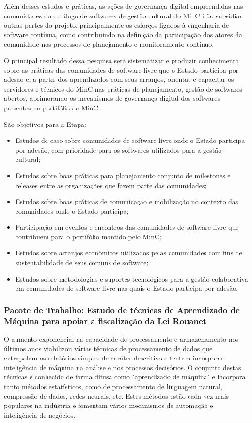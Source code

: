 Além desses estudos e práticas, as ações de governança digital empreendidas nas 
comunidades do catálogo de softwares de gestão cultural do MinC irão subsidiar 
outras partes do projeto, principalmente os esforços ligados à engenharia de software 
contínua, como contribuindo na definição da participação dos atores da comunidade nos
processos de planejamento e monitoramento contínuo.

O principal resultado dessa pesquisa será sistematizar e produzir conhecimento 
sobre as práticas das comunidades de software livre que o Estado participa por 
adesão e, a partir dos aprendizados com seus arranjos, orientar e capacitar 
os servidores e técnicos do MinC nas práticas de 
planejamento, gestão de softwares abertos, aprimorando os mecanismos de 
governança digital dos softwares presentes no portifólio do MinC.

São objetivos para a Etapa:

\begin{itemize}
  \item Estudos de caso sobre comunidades de software livre onde o Estado 
    participa por adesão, com prioridade para os softwares utilizados para a gestão cultural;
  \item Estudos sobre boas práticas para planejamento conjunto de milestones e 
    releases entre as organizações que fazem parte das comunidades;
  \item Estudos sobre boas práticas de comunicação e mobilização no contexto das 
    comunidades onde o Estado participa;
  \item Participação em eventos e encontros das comunidades de software livre 
    que contribuem para o portifólio mantido pelo MinC;
  \item Estudos sobre arranjos econômicos utilizados pelas comunidades com fins 
    de sustentabilidade de seus comuns de software;
  \item Estudos sobre metodologias e suportes tecnológicos para a gestão colaborativa 
    em comunidades de software livre nas quais o Estado participa por adesão.
\end{itemize}


\subsubsection{Pacote de Trabalho: Estudo de técnicas de Aprendizado de Máquina 
para apoiar a fiscalização da Lei Rouanet}

O aumento exponencial na capacidade de processamento e armazenamento nos 
últimos anos viabilizou várias técnicas de processamento de dados que extrapolam
os relatórios simples de caráter descritivo e tentam incorporar inteligência
de máquina na análise e nos processos decisórios. O conjunto destas técnicas é
conhecido de forma difusa como "aprendizado de máquina" e incorpora tanto métodos
estatísticos, como de processamento de linguagem natural, compressão de dados, redes 
neurais, etc. Estes métodos estão cada vez mais populares na indústria e fomentam
vários mecanismos de automação e inteligência de negócios.

